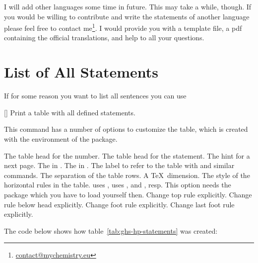 \documentclass[load-preamble+]{cnltx-doc}
\begin{document}
I will add other languages some time in future.  This may take a while,
though.  If you would be willing to contribute and write the statements of
another language please feel free to contact
me\footnote{\href{mailto:contact@mychemistry.eu}{contact@mychemistry.eu}}.  I
would provide you with a template file, a \acs{pdf} containing the official
translations, and help to all your questions.

\section{List of All Statements}
If for some reason you want to list all sentences you can use
\begin{commands}
  []
    Print a table with all defined statements.
\end{commands}

This command has a number of options to customize the table, which is created
with the  environment of the  package.
\begin{options}
    The table head for the number.
    The table head for the statement.
    The hint for a next page.
    The  in .
  \Default
    The  in .
    The label to refer to the table with  and similar commands.
  \Default{3pt}
    The separation of the table rows. A \TeX\ dimension.
    The style of the horizontal rules in the table.   uses
    ,  uses ,  and
    , resp.  This option needs the  package
    which you have to load yourself then.
    Change top rule explicitly.
    Change rule below head explicitly.
    Change foot rule explicitly.
    Change last foot rule explicitly.
\end{options}

The code below shows how table~\ref{tab:ghs-hp-statements} was created:
\begin{sourcecode}
  \ghslistall[fill-in,table-rules=booktabs]
\end{sourcecode}

\ghslistall[fill-in,table-rules=booktabs]
\end{document}
